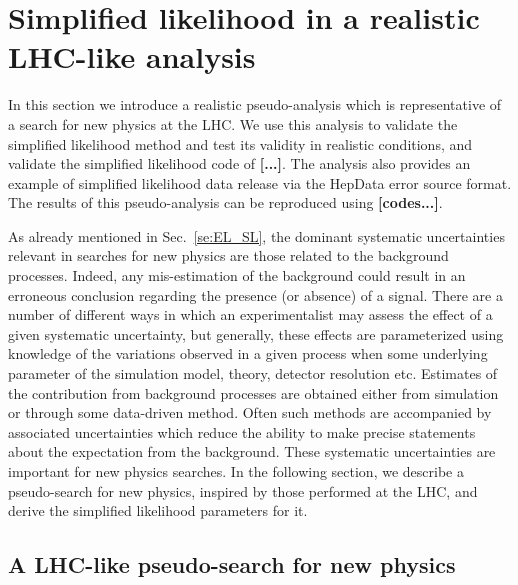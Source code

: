 \documentclass[11pt]{article}
\begin{document}
\section{Simplified likelihood in a  realistic LHC-like analysis }
\label{se:SL_LHC}


In this section we introduce a realistic pseudo-analysis  which is representative of a search for new physics at the LHC. We use this analysis to validate the simplified likelihood method and test its validity in realistic conditions, and validate the simplified likelihood code of \textbf{[...]}.
 The analysis also provides an example of simplified likelihood data release via the HepData error source format.
The results of this pseudo-analysis can be reproduced using \textbf{[codes...]}.





As already mentioned in Sec.~\ref{se:EL_SL}, the dominant systematic uncertainties relevant in searches for new physics are those related to the background processes. Indeed, any mis-estimation of the background could result in an erroneous conclusion regarding the presence (or absence) of a signal.
There are a number of different ways in which an experimentalist may assess the effect of a given systematic uncertainty, but generally, these effects are parameterized using knowledge of the variations observed in a given process when some underlying parameter of the simulation model, theory, detector resolution etc. Estimates of the contribution from background processes are obtained either from simulation or through some data-driven method. Often such methods are accompanied by associated  uncertainties which reduce the ability to make precise statements about the expectation from the background.
These systematic uncertainties are important for new physics searches. In the following section, we describe a pseudo-search for new physics, inspired by those performed at the LHC, and derive the simplified likelihood parameters for it.






\subsection{A LHC-like pseudo-search for new physics}
\label{se:toy_search}
\end{document}
